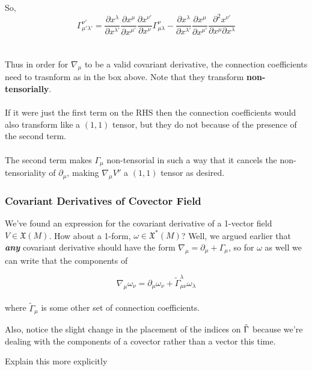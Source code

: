 \documentclass[11pt]{article}
\begin{document}
So, 
\[ \boxed{  \Gamma_{\mu' \lambda'}^{\nu'} = \frac{\partial x^{\lambda}}{\partial x^{\lambda'}} \frac{\partial x^{\mu}}{\partial x^{\mu'}} \frac{\partial x^{\nu'}}{\partial x^{\nu}} \Gamma_{\mu \lambda}^{\nu} - \frac{\partial x^{\lambda}}{\partial x^{\lambda'}} \frac{\partial x^{\mu}}{\partial x^{\mu'}} \frac{\partial^2 x^{\nu'}}{\partial x^{\mu} \partial x^{\lambda}} } \]
\\
\\
Thus in order for $\nabla_{\mu}$ to be a valid covariant derivative, the connection coefficients need to trasnform as in the box above. Note that they transform \textbf{non-tensorially}.
\\
\\
If it were just the first term on the RHS then the connection coefficients would also transform like a $(1,1)$ tensor, but they do not because of the presence of the second term.
\\
\\
The second term makes $\Gamma_{\mu}$ non-tensorial in such a way that it cancels the non-tensoriality of $\partial_{\mu}$, making $\nabla_{\mu} V^{\nu}$ a $(1,1)$ tensor as desired. 
\\
\subsubsection{Covariant Derivatives of Covector Field}
We've found an expression for the covariant derivative of a 1-vector field $V \in \mathfrak{X}(M)$. How about a 1-form, $\omega \in \mathfrak{X}^*(M)$? Well, we argued earlier that \emph{\textbf{any}} covariant derivative should have the form $\nabla_{\mu} = \partial_{\mu} + \Gamma_{\mu}$, so for $\omega$ as well we can write that the components of 

\[ \nabla_{\mu} \omega_{\nu} = \partial_{\mu} \omega_{\nu} + \tilde{\Gamma}_{\mu \nu}^{\lambda} \omega_{\lambda} \] \\
where $\tilde{\Gamma}_{\mu}$ is some other set of connection coefficients. 
\begin{dottedbox}
  Also, notice the slight change in the placement of the indices on $\Tilde{\Gamma}$ because we're dealing with the components of a covector rather than a vector this time. 
  \begin{note}
    {Explain this more explicitly}
  \end{note}
\end{dottedbox}
\end{document}
